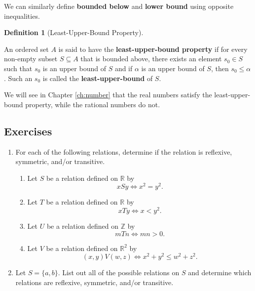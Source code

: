 \documentclass[
]{book}
\providecommand{\tightlist}{%
  \setlength{\itemsep}{0pt}\setlength{\parskip}{0pt}}
\theoremstyle{definition}
\newtheorem{definition}{Definition}[chapter]
\theoremstyle{definition}
\theoremstyle{definition}
\theoremstyle{definition}
\theoremstyle{remark}
\begin{document}
We can similarly define \textbf{bounded below} and \textbf{lower bound} using opposite inequalities.

\begin{definition}[Least-Upper-Bound Property]
\protect\hypertarget{def:unlabeled-div-26}{}\label{def:unlabeled-div-26}

An ordered set \(A\) is said to have the \textbf{least-upper-bound property} if for every non-empty subset \(S\subseteq A\) that is bounded above, there exists an element \(s_0\in S\) such that \(s_0\) is an upper bound of \(S\) and if \(\alpha\) is an upper bound of \(S\), then \(s_0\leq \alpha\). Such an \(s_0\) is called the \textbf{least-upper-bound} of \(S\).

\end{definition}

We will see in Chapter \ref{ch:number} that the real numbers satisfy the least-upper-bound property, while the rational numbers do not.

\hypertarget{exercises-7}{%
\subsection{Exercises}\label{exercises-7}}

\begin{enumerate}
\def\labelenumi{\arabic{enumi}.}
\tightlist
\item
  For each of the following relations, determine if the relation is reflexive, symmetric, and/or transitive.

  \begin{enumerate}
  \def\labelenumii{\alph{enumii}.}
  \tightlist
  \item
    Let \(S\) be a relation defined on \(\mathbb{R}\) by \[xSy \Leftrightarrow x^2=y^2.\]
  \item
    Let \(T\) be a relation defined on \(\mathbb{R}\) by \[xTy \Leftrightarrow x<y^2.\]
  \item
    Let \(U\) be a relation defined on \(\mathbb{Z}\) by \[mTn \Leftrightarrow mn>0.\]
  \item
    Let \(V\) be a relation defined on \(\mathbb{R}^2\) by \[ (x,y)V(w,z) \Leftrightarrow x^2+y^2 \leq w^2+z^2.\]
  \end{enumerate}
\item
  Let \(S=\{a,b\}\). List out all of the possible relations on \(S\) and determine which relations are reflexive, symmetric, and/or transitive.
\end{enumerate}
\end{document}
